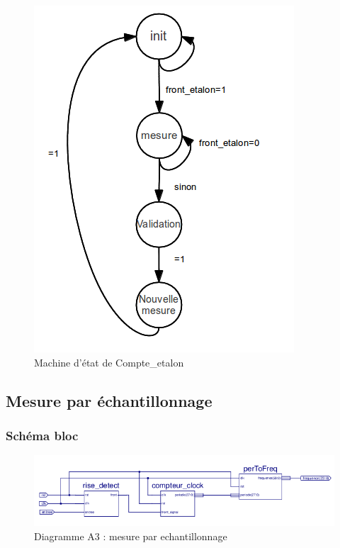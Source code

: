 \documentclass[a4paper,11pt]{article}
\begin{document}
\begin{figure}[H]
\begin{center}
	\includegraphics[scale=.6]{machine_mesureEtalon.png}
	\caption{Machine d'état de Compte\_etalon}
\end{center}
\end{figure}


  \subsection{Mesure par échantillonnage}
  \subsubsection{Schéma bloc}
  
  \begin{figure}[H]
\begin{center}
	\includegraphics[scale=1]{sch-echantillon.png}
	\caption{Diagramme A3 : mesure par echantillonnage}
\end{center}
\end{figure}
\end{document}
